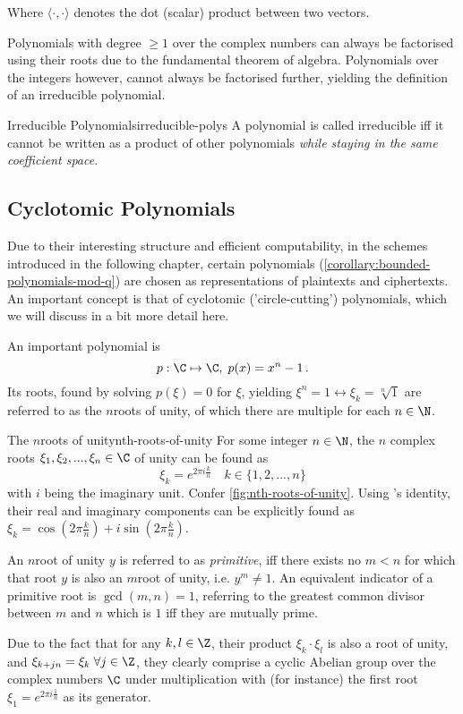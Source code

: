 Where $\langle \cdot, \cdot \rangle$ denotes the dot (scalar) product between two vectors.

Polynomials with degree $\geq 1$ over the complex numbers can always be factorised using their roots due to the fundamental theorem of algebra.
Polynomials over the integers however, cannot always be factorised further, yielding the definition of an irreducible polynomial.

\begin{definition}{Irreducible Polynomials}{irreducible-polys}
  A polynomial is called irreducible \gls{iff} it cannot be written as a product of other polynomials \textsl{while staying in the same coefficient space}.
\end{definition}

\subsection{Cyclotomic Polynomials}
Due to their interesting structure and efficient computability, in the schemes introduced in the following chapter, certain polynomials (\cref{corollary:bounded-polynomials-mod-q}) are chosen as representations of plaintexts and ciphertexts.
An important concept is that of cyclotomic ('circle-cutting') polynomials, which we will discuss in a bit more detail here.

An important polynomial is $$p: \C \mapsto \C, \; p(x) = x^n - 1 \,.$$
Its roots, found by solving $p(\xi) = 0$ for $\xi$, yielding $\xi^n = 1 \leftrightarrow \xi_k = \sqrt[n]{1}$ are referred to as the $n$\th roots of unity, of which there are multiple for each $n \in \N$.

\begin{lemma}{The $n$\th roots of unity}{nth-roots-of-unity}
  For some integer $n \in \N$, the $n$ complex roots $\xi_1, \xi_2, ..., \xi_n \in \C$ of unity can be found as $$\xi_k = e^{2\pi i \frac{k}{n}} \quad k \in \{1, 2, ..., n\}$$ with $i$ being the imaginary unit.
  Confer \cref{fig:nth-roots-of-unity}.
  Using 's identity, their real and imaginary components can be explicitly found as $\xi_k = \cos(2\pi \frac{k}{n}) + i \sin(2\pi \frac{k}{n})$.

  An $n$\th root of unity $y$ is referred to as \textit{primitive}, \gls{iff} there exists no $m < n$ for which that root $y$ is also an $m$\th root of unity, i.e. $y^m \neq 1$.
  An equivalent indicator of a primitive root is $\gcd(m, n) = 1$, referring to the greatest common divisor between $m$ and $n$ which is $1$ \gls{iff} they are mutually prime.
\end{lemma}
Due to the fact that for any $k, l \in \Z$, their product $\xi_k \cdot \xi_l$ is also a root of unity, and $\xi_{k+jn} = \xi_k \; \forall j \in \Z$, they clearly comprise a cyclic Abelian group over the complex numbers $\C$ under multiplication with (for instance) the first root $\xi_1 = e^{2\pi i \frac{1}{n}}$ as its generator.

